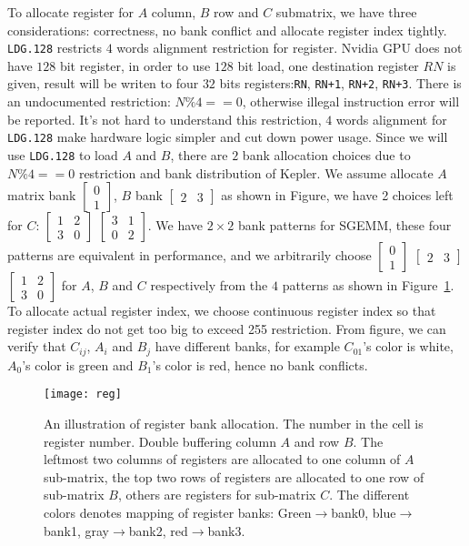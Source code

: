 To allocate register for $A$ column, $B$ row and $C$ submatrix, we have three considerations: correctness, no bank
conflict and allocate register index tightly.
{\tt LDG.128} restricts $4$ words alignment restriction for register.
Nvidia GPU does not have $128$ bit register, in order to use $128$ bit load, one destination register $RN$ is given, result will be writen to
four $32$ bits registers:{\tt RN}, {\tt RN+1}, {\tt RN+2}, {\tt RN+3}. There is an undocumented restriction: $N\%4==0$, otherwise illegal instruction error will be reported.
It's not hard to understand this restriction, $4$ words alignment for {\tt LDG.128} make hardware logic simpler and cut down power usage.
Since we will use {\tt LDG.128} to load $A$ and $B$, there are $2$ bank allocation choices due to $N\%4==0$ restriction and
bank distribution of Kepler. We assume allocate $A$ matrix bank $\begin{bmatrix} 0 \\ 1  \end{bmatrix}$,
$B$ bank $\begin{bmatrix} 2 & 3 \end{bmatrix}$ as shown in Figure, we have 2 choices left for $C$:
$\begin{bmatrix} 1 & 2 \\ 3 & 0  \end{bmatrix}$
$\begin{bmatrix} 3 & 1 \\ 0 & 2  \end{bmatrix}$.
We have $2\times2$ bank patterns for SGEMM, these four patterns are equivalent in performance, and we arbitrarily choose $\begin{bmatrix} 0 \\ 1  \end{bmatrix}$ $\begin{bmatrix} 2 & 3 \end{bmatrix}$
    $\begin{bmatrix} 1 & 2 \\ 3 & 0  \end{bmatrix}$ for $A$, $B$ and $C$ respectively from the $4$ patterns as shown in Figure~\ref{fig:reg}.
To allocate actual register index, we choose continuous register index so that register index do not get too big to
exceed 255 restriction. From figure, we can verify that $C_{ij}$, $A_i$ and $B_j$ have different banks, for example
$C_{01}$'s color is white, $A_0$'s color is green and $B_1$'s color is red, hence no bank conflicts.

\begin{figure}[htbp]
\begin{center}
\texttt{[image: reg]}
\caption{An illustration of register bank allocation. The number in the cell is register number. Double buffering column
    $A$ and row $B$. The leftmost two columns of registers are allocated to one column of $A$ sub-matrix, the
top two rows of registers are allocated to one row of sub-matrix $B$, others are registers for
sub-matrix $C$. The different colors denotes mapping of register banks: Green$\rightarrow$bank0, blue$\rightarrow$bank1, gray$\rightarrow$bank2, red$\rightarrow$bank3.}
\label{fig:reg}
\end{center}
\end{figure}


